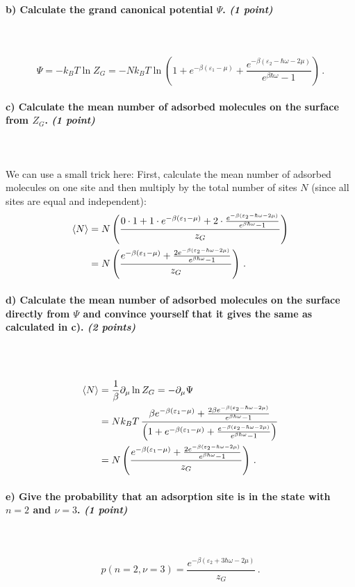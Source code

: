 \paragraph{b) Calculate the grand canonical potential $\Psi$. 
    \textit{(1 point)}
} \ \\
\\
\begin{equation}
	\Psi = - k_B T \ln Z_G = - N k_B T \ln \left( 1 + e^{-\beta (\varepsilon_1 - \mu)} 
		+ \frac{e^{-\beta(\varepsilon_2 - \hbar\omega - 2\mu)}}{e^{\beta\hbar\omega}-1}  \right) \,.
\end{equation}

\newpage

\paragraph{c) Calculate the mean number of adsorbed molecules on the 
    surface from $Z_G$. \textit{(1 point)}
} \ \\
\\
We can use a small trick here: First, calculate the mean number of adsorbed
molecules on one site and then multiply by the total number of sites $N$
(since all sites are equal and independent):
\begin{align}
	\langle N \rangle &= N \left( \frac{0\cdot 1 + 1\cdot e^{-\beta (\varepsilon_1 - \mu)}
	+2\cdot\frac{e^{-\beta(\varepsilon_2 - \hbar\omega - 2\mu)}}{e^{\beta\hbar\omega}-1}}{z_G} \right) \notag \\
	&= N \left( \frac{e^{-\beta (\varepsilon_1 - \mu)}
	+\frac{2e^{-\beta(\varepsilon_2 - \hbar\omega - 2\mu)}}{e^{\beta\hbar\omega}-1}}{z_G} \right) \,.
\end{align}

\paragraph{d) Calculate the mean number of adsorbed molecules on the 
    surface directly from $\Psi$ and convince yourself that it gives 
    the same as calculated in c). 
    \textit{(2 points)}
} \ \\
\\
\begin{align}
	\langle N \rangle &= \frac{1}{\beta} \partial_{\mu} \ln Z_G = - \partial_{\mu} \Psi \notag \\
	&= N k_B T \, \frac{\beta e^{-\beta (\varepsilon_1 - \mu)}
	+\frac{2\beta e^{-\beta(\varepsilon_2 - \hbar\omega - 2\mu)}}{e^{\beta\hbar\omega}-1}}
	{\left( 1 + e^{-\beta (\varepsilon_1 - \mu)} 
	+ \frac{e^{-\beta(\varepsilon_2 - \hbar\omega - 2\mu)}}{e^{\beta\hbar\omega}-1}  \right)} \notag \\
	&= N \left( \frac{e^{-\beta (\varepsilon_1 - \mu)}
	+\frac{2e^{-\beta(\varepsilon_2 - \hbar\omega - 2\mu)}}{e^{\beta\hbar\omega}-1}}{z_G} \right) \,.
\end{align}

\paragraph{e) Give the probability that an adsorption site is in the 
    state with $n=2$ and $\nu=3$. \textit{(1 point)}
} \ \\
\\
\begin{equation}
	p(n=2,\nu=3) = \frac{e^{-\beta (\varepsilon_2 + 3\hbar\omega - 2\mu)}}{z_G} \,.
\end{equation}